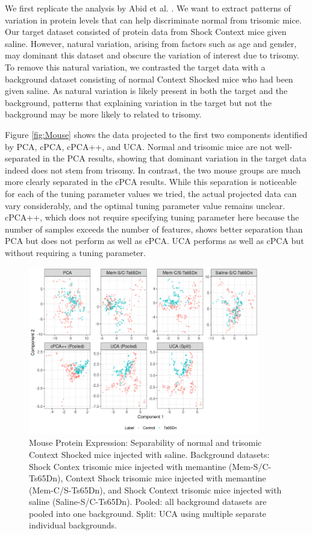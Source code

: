 \documentclass[12pt]{article}
\begin{document}
We first replicate the analysis by Abid et al. \cite{Abid}. We want to extract patterns of variation in protein levels that can help discriminate normal from trisomic mice. Our target dataset consisted of protein data from Shock Context mice given saline. However, natural variation, arising from factors such as age and gender, may dominant this dataset and obscure the variation of interest due to trisomy. To remove this natural variation, we contrasted the target data with a background dataset consisting of normal Context Shocked mice who had been given saline. As natural variation is likely present in both the target and the background, patterns that explaining variation in the target but not the background may be more likely to related to trisomy.

Figure \ref{fig:Mouse} shows the data projected to the first two components identified by PCA, cPCA, cPCA++, and UCA. Normal and trisomic mice are not well-separated in the PCA results, showing that dominant variation in the target data indeed does not stem from trisomy. In contrast, the two mouse groups are much more clearly separated in the cPCA results. While this separation is noticeable for each of the tuning parameter values we tried, the actual projected data can vary considerably, and the optimal tuning parameter value remains unclear.
cPCA++, which does not require specifying tuning parameter here because the number of samples exceeds the number of features, shows better separation than PCA but does not perform as well as cPCA. UCA performs as well as cPCA but without requiring a tuning parameter.

\begin{figure}[th!]
  \centering
  \includegraphics[width = 0.9\textwidth]{figure/Mouse_split_stack_Ts65Dn.png}
  \caption{Mouse Protein Expression: Separability of normal and trisomic Context Shocked mice injected with saline. Background datasets: Shock Contex trisomic mice injected with memantine (Mem-S/C-Ts65Dn), Context Shock trisomic mice injected with memantine (Mem-C/S-Ts65Dn), and Shock Context trisomic mice injected with saline (Saline-S/C-Ts65Dn). Pooled: all background datasets are pooled into one background. Split: UCA using multiple separate individual backgrounds.}
  \label{fig:MouseSplitStack}
\end{figure}
\end{document}
